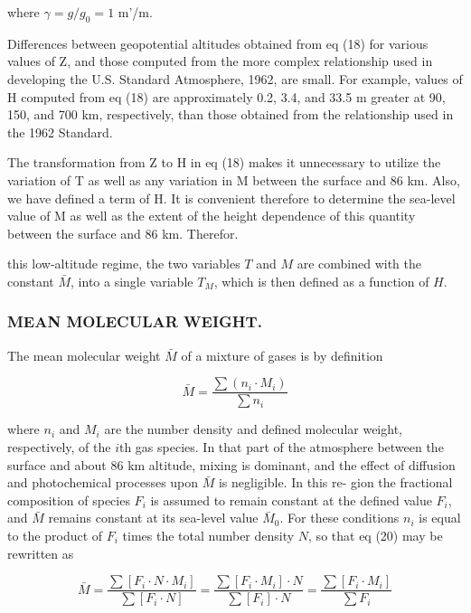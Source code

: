 \documentclass{article}
\begin{document}
where $\gamma = g/g_0 = 1$ m'/m.

Differences between geopotential altitudes obtained from eq (18) for various values of Z, and those computed from the more complex relationship used in developing the U.S. Standard Atmosphere, 1962, are small. For example, values of H computed from eq (18) are approximately 0.2, 3.4, and 33.5 m greater at 90, 150, and 700 km, respectively, than those obtained from the relationship used in the 1962 Standard.

The transformation from Z to H in eq (18) makes it unnecessary to utilize the variation of T as well as any variation in M between the surface and 86 km. Also, we have defined a term of H. It is convenient therefore to determine the sea-level value of M as well as the extent of the height dependence of this quantity between the surface and 86 km. Therefor.

\noindent this low-altitude regime, the two variables $T$ and $M$ are combined with the constant $\bar{M}$, into a single variable $T_M$, which is then defined as a function of $H$.

\subsubsection{MEAN MOLECULAR WEIGHT.}
The mean molecular weight $\bar{M}$ of a mixture of gases is by definition

\begin{equation}
 \bar{M} = \frac{\sum (n_i \cdot M_i)}{\sum n_i} \tag{20}
\end{equation}

where $n_i$ and $M_i$ are the number density and defined molecular weight, respectively, of the $i$th gas species. In that part of the atmosphere between the surface and about 86 km altitude, mixing is dominant, and the effect of diffusion and photochemical processes upon $\bar{M}$ is negligible. In this re- gion the fractional composition of species $F_i$ is assumed to remain constant at the defined value $F_i$, and $\bar{M}$ remains constant at its sea-level value $\bar{M}_0$. For these conditions $n_i$ is equal to the product of $F_i$ times the total number density $N$, so that eq (20) may be rewritten as

\begin{equation}
 \bar{M} = \frac{\sum [F_i \cdot N \cdot M_i]}{\sum [F_i \cdot N]} = \frac{\sum [F_i \cdot M_i] \cdot N}{\sum [F_i] \cdot N} = \frac{\sum [F_i \cdot M_i]}{\sum F_i} \tag{21}
\end{equation}
\end{document}
